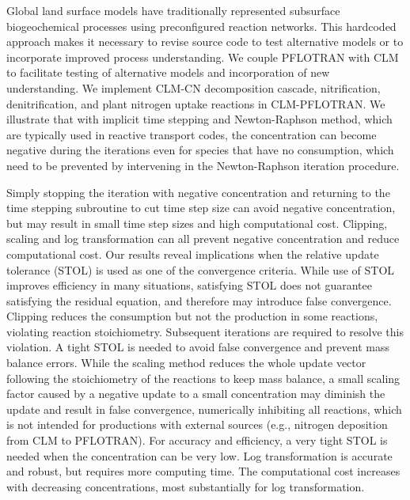 \documentclass[gmd, manuscript]{copernicus}
\begin{document}
%
Global land surface models have traditionally represented subsurface
biogeochemical processes using preconfigured reaction networks. This hardcoded
approach makes it necessary to revise source code to test alternative models or
to incorporate improved process understanding. We couple PFLOTRAN with CLM to
facilitate testing of alternative models and incorporation of new
understanding. We implement CLM-CN decomposition cascade, nitrification,
denitrification, and plant nitrogen uptake reactions in CLM-PFLOTRAN. We
illustrate that with implicit time stepping and Newton-Raphson method, which
are typically used in reactive transport codes, the concentration can become
negative during the iterations even for species that have no consumption, which
need to be prevented by intervening in the Newton-Raphson iteration procedure. 

Simply stopping the iteration with negative concentration and returning to the
time stepping subroutine to cut time step size can avoid negative
concentration, but may result in small time step sizes and high computational
cost. Clipping, scaling  and log transformation can all prevent negative
concentration and reduce computational cost. Our results reveal implications
when the relative update tolerance (STOL) is used as one of the convergence criteria. 
While use of STOL improves efficiency in many situations, satisfying STOL does
not guarantee satisfying the residual equation, and therefore may introduce
false convergence. Clipping reduces the consumption but not the production in
some reactions, violating reaction stoichiometry. Subsequent iterations are
required to resolve this violation. A tight STOL is needed to avoid false
convergence and prevent mass balance errors. While the scaling method reduces
the whole update vector following the stoichiometry of the reactions to keep
mass balance, a small scaling factor caused by a negative update to a small
concentration may diminish the update and result in false convergence,
numerically inhibiting all reactions, which is not intended for productions
with external sources (e.g., nitrogen deposition from CLM to PFLOTRAN). For
accuracy and efficiency, a very tight STOL is needed when the concentration can
be very low. Log transformation is accurate and robust, but requires more
computing time. The computational cost increases with decreasing
concentrations, most substantially for log transformation.
\end{document}
